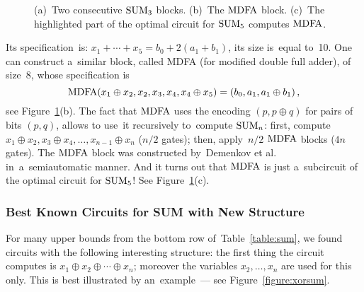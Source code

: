 \begin{figure}
\begin{center}
\end{center}
\caption{(a)~Two consecutive $\operatorname{SUM}_3$ blocks. (b)~The $\operatorname{MDFA}$ block. (c)~The highlighted part of the optimal circuit
for $\operatorname{SUM}_5$ computes $\operatorname{MDFA}$.}
\label{figure:mdfa}
\end{figure}
%
Its specification~is: $x_1+\dotsb+x_5=b_0+2(a_1+b_1)$, its size is~equal to~10. One can construct a~similar block, called MDFA (for modified double full adder), of size~8, whose specification is
\[\operatorname{MDFA}(x_1 \oplus x_2, x_2, x_3, x_4, x_4 \oplus x_5)=(b_0, a_1, a_1 \oplus b_1) \, ,\]
see Figure~\ref{figure:mdfa}(b).
The fact that $\operatorname{MDFA}$ uses the encoding $(p, p \oplus q)$ for pairs of bits $(p,q)$, allows to use~it recursively
to~compute $\operatorname{SUM}_n$: first, compute $x_1 \oplus x_2, x_3 \oplus x_4, \dotsc, x_{n-1} \oplus x_n$ ($n/2$ gates); then,
apply~$n/2$ $\operatorname{MDFA}$ blocks ($4n$ gates).
The $\operatorname{MDFA}$ block was constructed by~Demenkov et al.~\cite{DBLP:journals/ipl/DemenkovKKY10} in~a~semiautomatic
manner. And it turns out that $\operatorname{MDFA}$ is just a~subcircuit of the optimal circuit for $\operatorname{SUM}_5$! See Figure~\ref{figure:mdfa}(c).


\subsubsection{Best Known Circuits for SUM with New Structure}

For many upper bounds from the bottom row of~Table~\ref{table:sum}, we found circuits with the following interesting structure: the first thing the circuit computes is $x_1 \oplus x_2 \oplus \dotsb \oplus x_n$; moreover the variables $x_2, \dotsc, x_n$ are used for this only. This is best illustrated by an~example~--- see Figure~\ref{figure:xorsum}.

